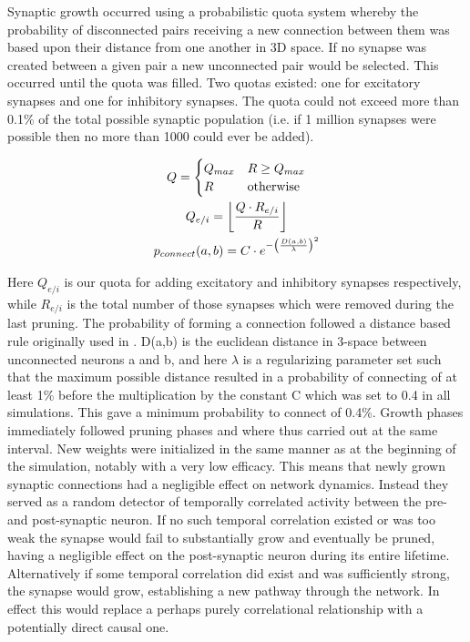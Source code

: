 \documentclass[10pt,letterpaper]{article}
\DeclarePairedDelimiter\floor{\lfloor}{\rfloor}
\begin{document}
Synaptic growth occurred using a probabilistic quota system whereby the probability of disconnected pairs receiving a new connection between them was based upon their distance from one another in 3D space. If no synapse was created between a given pair a new unconnected pair would be selected. This occurred until the quota was filled. Two quotas existed: one for excitatory synapses and one for inhibitory synapses. The quota could not exceed more than 0.1\% of the total possible synaptic population (i.e. if 1 million synapses were possible then no more than 1000 could ever be added). 

\begin{gather}
	Q =  \begin{cases}
		Q_{max} & R \geq Q_{max} \\
		R & \text{otherwise}
	\end{cases}\\
	Q_{e/i} = \floor*{\frac{Q\cdot R_{e/i}}{R}}\\
	p_{connect}(a, b) = C \cdot e^{-\left(\frac{D(a, b)}{\lambda}\right)^2}
\end{gather}


Here $Q_{e/i}$ is our quota for adding excitatory and inhibitory synapses respectively, while $R_{e/i}$ is the total number of those synapses which were removed during the last pruning. The probability of forming a connection followed a distance based rule originally used in \cite{maass2002real}. D(a,b) is the euclidean distance in 3-space between unconnected neurons a and b, and here $\lambda$ is a regularizing parameter set such that the maximum possible distance resulted in a probability of connecting of at least 1\% before the multiplication by the constant C which was set to 0.4 in all simulations. This gave a minimum probability to connect of 0.4\%. Growth phases immediately followed pruning phases and where thus carried out at the same interval. New weights were initialized in the same manner as at the beginning of the simulation, notably with a very low efficacy. This means that newly grown synaptic connections had a negligible effect on network dynamics. Instead they served as a random detector of temporally correlated activity between the pre- and post-synaptic neuron. If no such temporal correlation existed or was too weak the synapse would fail to substantially grow and eventually be pruned, having a negligible effect on the post-synaptic neuron during its entire lifetime. Alternatively if some temporal correlation did exist and was sufficiently strong, the synapse would grow, establishing a new pathway through the network. In effect this would replace a perhaps purely correlational relationship with a potentially direct causal one. 
\end{document}
